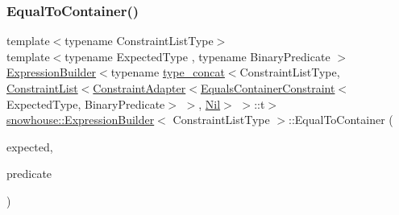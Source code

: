 \subsubsection{\texorpdfstring{EqualToContainer()}{EqualToContainer()}\hspace{0.1cm}{\footnotesize\ttfamily [2/2]}}
{\footnotesize\ttfamily template$<$typename Constraint\+List\+Type$>$ \\
template$<$typename Expected\+Type , typename Binary\+Predicate $>$ \\
\mbox{\hyperlink{structsnowhouse_1_1ExpressionBuilder}{Expression\+Builder}}$<$typename \mbox{\hyperlink{structsnowhouse_1_1type__concat}{type\+\_\+concat}}$<$Constraint\+List\+Type, \mbox{\hyperlink{structsnowhouse_1_1ConstraintList}{Constraint\+List}}$<$\mbox{\hyperlink{structsnowhouse_1_1ConstraintAdapter}{Constraint\+Adapter}}$<$\mbox{\hyperlink{structsnowhouse_1_1EqualsContainerConstraint}{Equals\+Container\+Constraint}}$<$Expected\+Type, Binary\+Predicate$>$ $>$, \mbox{\hyperlink{structsnowhouse_1_1Nil}{Nil}}$>$ $>$\+::t$>$ \mbox{\hyperlink{structsnowhouse_1_1ExpressionBuilder}{snowhouse\+::\+Expression\+Builder}}$<$ Constraint\+List\+Type $>$\+::Equal\+To\+Container (\begin{DoxyParamCaption}\item[{const Expected\+Type \&}]{expected,  }\item[{const Binary\+Predicate}]{predicate }\end{DoxyParamCaption})\hspace{0.3cm}{\ttfamily [inline]}}

\mbox{\label{structsnowhouse_1_1ExpressionBuilder_ae19545152046a26cd46d274b0f37b0db}} 
